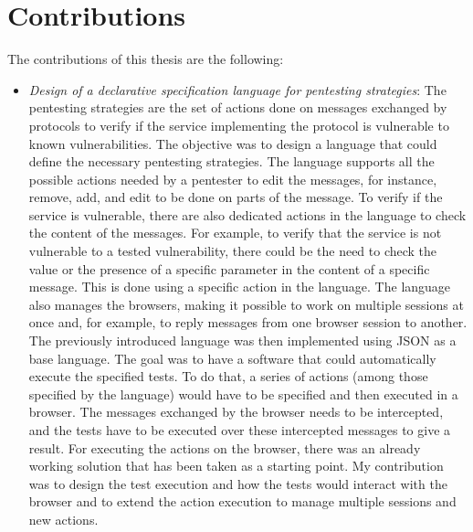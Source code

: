 \section{Contributions}
\label{sec:contributions}
The contributions of this thesis are the following:
\begin{itemize}
    \item \textit{Design of a declarative specification language for pentesting strategies}: The pentesting strategies are the set of actions done on messages exchanged by protocols to verify if the service implementing the protocol is vulnerable to known vulnerabilities. The objective was to design a language that could define the necessary pentesting strategies. The language supports all the possible actions needed by a pentester to edit the messages, for instance, remove, add, and edit to be done on parts of the message. To verify if the service is vulnerable, there are also dedicated actions in the language to check the content of the messages. For example, to verify that the service is not vulnerable to a tested vulnerability, there could be the need to check the value or the presence of a specific parameter in the content of a specific message. This is done using a specific action in the language. The language also manages the browsers, making it possible to work on multiple sessions at once and, for example, to reply messages from one browser session to another. The previously introduced language was then implemented using JSON as a base language. The goal was to have a software that could automatically execute the specified tests. To do that, a series of actions (among those specified by the language) would have to be specified and then executed in a browser. The messages exchanged by the browser needs to be intercepted, and the tests have to be executed over these intercepted messages to give a result. For executing the actions on the browser, there was an already working solution \cite{wendy_barreto, claudio_grisenti} that has been taken as a starting point. My contribution was to design the test execution and how the tests would interact with the browser and to extend the action execution to manage multiple sessions and new actions. 


\end{itemize}
